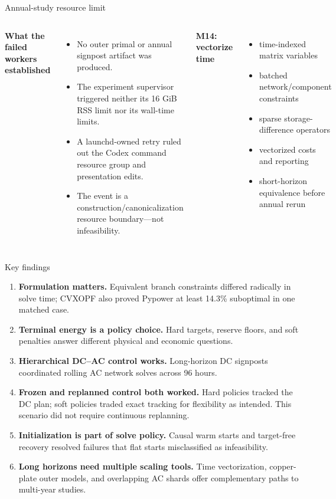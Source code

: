 \documentclass[aspectratio=169,11pt]{beamer}
\newcommand{\tightitems}{\setlength{\itemsep}{0.42em}}
\begin{document}
\begin{frame}{Annual-study resource limit}
  \begin{columns}[T,onlytextwidth]
    \textbf{What the failed workers established}
      \begin{itemize}\tightitems
        \item No outer primal or annual signpost artifact was produced.
        \item The experiment supervisor triggered neither its 16 GiB RSS limit nor its wall-time limits.
        \item A launchd-owned retry ruled out the Codex command resource group and presentation edits.
        \item The event is a construction/canonicalization resource boundary—not infeasibility.
      \end{itemize}
    \textbf{M14: vectorize time}
      \begin{itemize}\tightitems
        \item time-indexed matrix variables
        \item batched network/component constraints
        \item sparse storage-difference operators
        \item vectorized costs and reporting
        \item short-horizon equivalence before annual rerun
      \end{itemize}
  \end{columns}
\end{frame}

\begin{frame}{Key findings}
  \small
  \begin{enumerate}\tightitems
    \item \textbf{Formulation matters.} Equivalent branch constraints differed radically in solve time; CVXOPF also proved Pypower at least 14.3\% suboptimal in one matched case.
    \item \textbf{Terminal energy is a policy choice.} Hard targets, reserve floors, and soft penalties answer different physical and economic questions.
    \item \textbf{Hierarchical DC--AC control works.} Long-horizon DC signposts coordinated rolling AC network solves across 96 hours.
    \item \textbf{Frozen and replanned control both worked.} Hard policies tracked the DC plan; soft policies traded exact tracking for flexibility as intended. This scenario did not require continuous replanning.
    \item \textbf{Initialization is part of solve policy.} Causal warm starts and target-free recovery resolved failures that flat starts misclassified as infeasibility.
    \item \textbf{Long horizons need multiple scaling tools.} Time vectorization, copper-plate outer models, and overlapping AC shards offer complementary paths to multi-year studies.
  \end{enumerate}
\end{frame}
\end{document}
